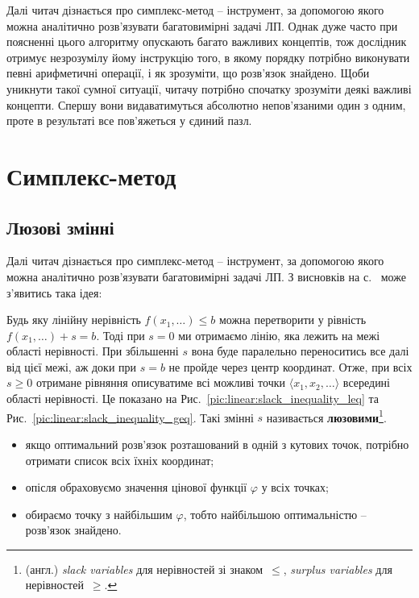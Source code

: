 \documentclass[\main/book.tex]{subfiles}
\begin{document}
Далі читач дізнається про симплекс-метод -- інструмент, за допомогою якого можна аналітично розв'язувати багатовимірні задачі ЛП. Однак дуже часто при поясненні цього алгоритму опускають багато важливих концептів, тож дослідник отримує незрозумілу йому інструкцію того, в якому порядку потрібно виконувати певні арифметичні операції, і як зрозуміти, що розв'язок знайдено. Щоби уникнути такої сумної ситуації, читачу потрібно спочатку зрозуміти деякі важливі концепти. Спершу вони видаватимуться абсолютно непов'язаними один з одним, проте в результаті все пов'яжеться у єдиний пазл.
\section{Симплекс-метод}
\label{section:linear:simplex}

\subsection{Люзові змінні}
Далі читач дізнається про симплекс-метод -- інструмент, за допомогою якого можна аналітично розв'язувати багатовимірні задачі ЛП. З висновків на с.~\pageref{conclusion:linear:optimal_solution} може з'явитись така ідея:

Будь яку лінійну нерівність $f(x_1, \ldots) \leq b$ можна перетворити у рівність $f(x_1, \ldots) + s = b$. Тоді при ${s=0}$ ми отримаємо лінію, яка лежить на межі області нерівності. При збільшенні $s$ вона буде паралельно переноситись все далі від цієї межі, аж доки при $s=b$ не пройде через центр координат. Отже, при всіх $s \geq 0$ отримане рівняння описуватиме всі можливі точки $\langle x_1, x_2, \ldots \rangle$ всередині області нерівності. Це показано на Рис.~\ref{pic:linear:slack_inequality_leq} та Рис.~\ref{pic:linear:slack_inequality_geq}. Такі змінні $s$ називається \textbf{люзовими}\footnote{(англ.) \textit{slack variables} для нерівностей зі знаком~\flqq{}$\leq$\frqq{}, \textit{surplus variables} для нерівностей~\flqq{}$\geq$\frqq{}.}.
\begin{itemize}
 \item якщо оптимальний розв'язок розташований в одній з кутових точок, потрібно отримати список всіх їхніх координат;
 \item опісля обраховуємо значення цінової функції $\varphi$ у всіх точках;
 \item обираємо точку з найбільшим $\varphi$, тобто найбільшою оптимальністю -- розв'язок знайдено.
\end{itemize}
\end{document}
